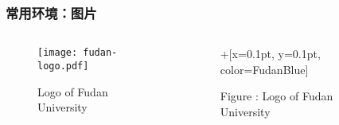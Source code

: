\begin{frame}[fragile]
\frametitle{常用环境：图片}
\begin{columns}
\begin{column}{0.64\textwidth}
  \begin{texcode}[gobble=4, moretexcs={\graphicspath,\includegraphics},
      emph={[1]figure}, emph={[2]graphicx}]
    \usepackage{graphicx}
    \graphicspath{{./images/}}

    \begin{figure}
      \centering
      \texttt{[image: fudan-logo.pdf]}
      \caption{Logo of Fudan University}
      \label{fig:fudan-logo}
    \end{figure}
  \end{texcode}
\end{column}
\pause
\begin{column}{0.28\textwidth}
  \begin{figure}
    \centering
    \fduemblem+[x=0.1pt, y=0.1pt, color=FudanBlue]
    \caption{\textcolor{keyword}{Figure \thefigure:} Logo of Fudan University}
    \label{fig:fudan-logo_}  %
  \end{figure}
\end{column}
\end{columns}
\end{frame}


